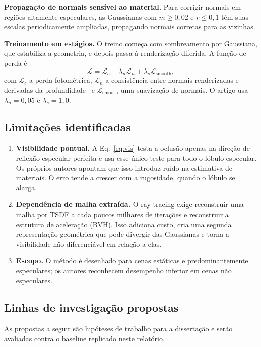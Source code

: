 \documentclass[conference]{IEEEtran}
\begin{document}
\textbf{Propagação de normais sensível ao material.} Para corrigir normais em regiões altamente especulares, as Gaussianas com $m \geq 0{,}02$ e $r \leq 0{,}1$ têm suas escalas periodicamente ampliadas, propagando normais corretas para as vizinhas.

\textbf{Treinamento em estágios.} O treino começa com sombreamento por Gaussiana, que estabiliza a geometria, e depois passa à renderização diferida. A função de perda é
\begin{equation}
\mathcal{L} = \mathcal{L}_c + \lambda_n \mathcal{L}_n + \lambda_s \mathcal{L}_{\text{smooth}},
\end{equation}
com $\mathcal{L}_c$ a perda fotométrica, $\mathcal{L}_n$ a consistência entre normais renderizadas e derivadas da profundidade~\cite{huang2024_2dgs} e $\mathcal{L}_{\text{smooth}}$ uma suavização de normais. O artigo usa $\lambda_n=0{,}05$ e $\lambda_s=1{,}0$.

\subsection{Limitações identificadas}

\begin{enumerate}
\item \textbf{Visibilidade pontual.} A Eq.~\eqref{eq:vis} testa a oclusão apenas na direção de reflexão especular perfeita e usa esse único teste para todo o lóbulo especular. Os próprios autores apontam que isso introduz ruído na estimativa de materiais. O erro tende a crescer com a rugosidade, quando o lóbulo se alarga.
\item \textbf{Dependência de malha extraída.} O ray tracing exige reconstruir uma malha por TSDF a cada poucos milhares de iterações e reconstruir a estrutura de aceleração (BVH). Isso adiciona custo, cria uma segunda representação geométrica que pode divergir das Gaussianas e torna a visibilidade não diferenciável em relação a elas.
\item \textbf{Escopo.} O método é desenhado para cenas estáticas e predominantemente especulares; os autores reconhecem desempenho inferior em cenas não especulares.
\end{enumerate}

\subsection{Linhas de investigação propostas}

As propostas a seguir são hipóteses de trabalho para a dissertação e serão avaliadas contra o baseline replicado neste relatório.
\end{document}
